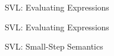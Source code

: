 
\begin{figure}
    
    \caption{SVL: Evaluating Expressions}
\end{figure}

\begin{figure}
    \boxed{\evalphi \phi}
    
    \caption{SVL: Evaluating Expressions}
\end{figure}

\begin{figure}
    
    \caption{SVL: Small-Step Semantics}
\end{figure}